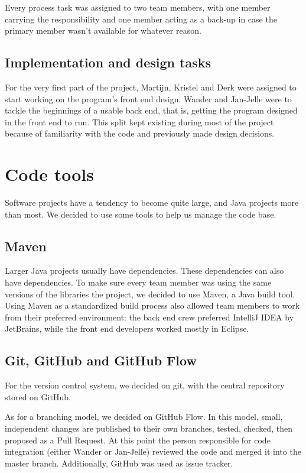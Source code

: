 Every process task was assigned to two team members, with one member carrying the responsibility and one member acting as a back-up in case the primary member wasn't available for whatever reason.

\subsection{Implementation and design tasks}

For the very first part of the project, Martijn, Kristel and Derk were assigned to start working on the program's front end design. Wander and Jan-Jelle were to tackle the beginnings of a usable back end, that is, getting the program designed in the front end to run. This split kept existing during most of the project because of familiarity with the code and previously made design decisions.

\section{Code tools}

Software projects have a tendency to become quite large, and Java projects more than most. We decided to use some tools to help us manage the code base.

\subsection{Maven}

Larger Java projects usually have dependencies. These dependencies can also have dependencies. To make sure every team member was using the same versions of the libraries the project, we decided to use Maven, a Java build tool. Using Maven as a standardized build process also allowed team members to work from their preferred environment: the back end crew preferred IntelliJ IDEA by JetBrains, while the front end developers worked mostly in Eclipse. 

\subsection{Git, GitHub and GitHub Flow}

For the version control system, we decided on git, with the central repository stored on GitHub.  

As for a branching model, we decided on GitHub Flow\cite{githubflow}. In this model, small, independent changes are published to their own branches, tested, checked, then proposed as a Pull Request. At this point the person responsible for code integration (either Wander or Jan-Jelle) reviewed the code and merged it into the master branch.  Additionally, GitHub was used as issue tracker.

